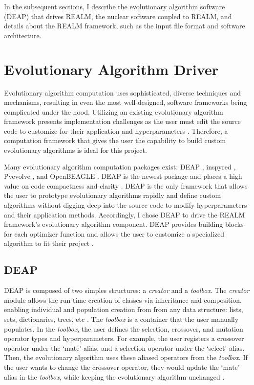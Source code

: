 In the subsequent sections, I describe the evolutionary algorithm software (DEAP)
that drives \gls{REALM}, the nuclear software coupled to \gls{REALM}, and details about 
the \gls{REALM} framework, such as the input file format and software architecture. 

\section{Evolutionary Algorithm Driver}
Evolutionary algorithm computation uses sophisticated, diverse techniques 
and mechanisms, resulting in even the most well-designed, software frameworks 
being complicated under the hood. 
Utilizing an existing evolutionary algorithm framework presents implementation 
challenges as the user must edit the source code to customize for their 
application and hyperparameters \cite{fortin_deap_2012}. 
Therefore, a computation framework that gives the user the capability to build 
custom evolutionary algorithms is ideal for this project.

Many evolutionary algorithm computation packages exist: 
\gls{DEAP} \cite{fortin_deap_2012}, inspyred \cite{garrett_inspyred_2014}, 
Pyevolve \cite{perone_pyevolve_2009}, and OpenBEAGLE \cite{gagne_open_2002}.
\gls{DEAP} is the newest package and places a high value on code 
compactness and clarity \cite{fortin_deap_2012}. 
\gls{DEAP} is the only framework that allows the user to prototype evolutionary 
algorithms rapidly and define custom algorithms without digging deep into 
the source code to modify hyperparameters and their application methods.
Accordingly, I chose \gls{DEAP} to drive the \gls{REALM} framework's 
evolutionary algorithm component. 
\gls{DEAP} provides building blocks for each optimizer function and allows the 
user to customize a specialized algorithm to fit their project \cite{fortin_deap_2012}.

\subsection{\acrlong{DEAP}}
\label{sec:deap-works}
\gls{DEAP} is composed of two simples structures: a \textit{creator} and a 
\textit{toolbox}.  
The \textit{creator} module allows the run-time creation of classes via 
inheritance and composition, enabling individual and population creation from 
from any data structure: lists, sets, dictionaries, trees, etc \cite{fortin_deap_2012}. 
The \textit{toolbox} is a container that the user manually populates.
In the \textit{toolbox}, the user defines the selection, crossover, and 
mutation operator types and hyperparameters. 
For example, the user registers a crossover operator under the `mate'
alias, and a selection operator under the `select' alias. 
Then, the evolutionary algorithm uses these aliased operators from the 
\textit{toolbox}. 
If the user wants to change the crossover operator, they would update the 
`mate' alias in the \textit{toolbox}, while keeping the evolutionary algorithm 
unchanged \cite{fortin_deap_2012}. 

